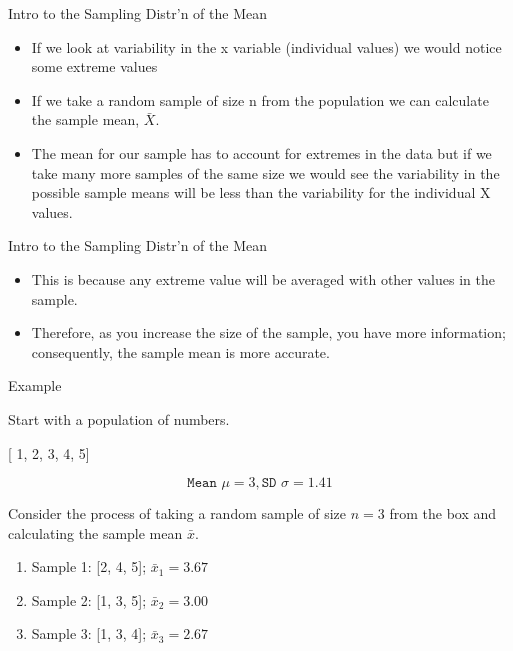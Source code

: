 \documentclass[14pt]{beamer}\usepackage[]{graphicx}\usepackage[]{color}
\begin{document}
\begin{frame}[fragile]{Intro to the Sampling Distr'n of the Mean}

\begin{itemize}
\item<1-> If we look at variability in the x variable (individual values) we would notice some extreme values
\item<2-> If we take a random sample of size n from the population we can calculate the sample mean, $\bar{X}$.
\item<3-> The mean for our sample has to account for extremes in  the data but if we take many more samples of the same size we would see the variability in the possible sample means will be less than the variability for the individual X values.
\end{itemize}
\end{frame}

\begin{frame}[fragile]{Intro to the Sampling Distr'n of the Mean}

\begin{itemize}
\item<1-> This is because any extreme value will be averaged with other values in the sample. 
\item<2-> Therefore, as you increase the size of the sample, you have  more information; consequently, the sample mean is more accurate.
\end{itemize}
\end{frame}

\begin{frame}[fragile]{Example}

Start with a population of numbers.

[ 1, 2, 3, 4, 5]

$$\texttt{Mean } \mu = 3, \texttt{SD } \sigma = 1.41$$

Consider the process of taking a random sample of size $n = 3$  from the box and calculating the sample mean $\bar{x}$. 

\begin{enumerate}
\item<1-> Sample 1: [2, 4, 5];  $\bar{x}_1 = 3.67$
\item<2-> Sample 2: [1, 3, 5];  $\bar{x}_2 = 3.00$
\item<3-> Sample 3: [1, 3, 4];  $\bar{x}_3 = 2.67$
\end{enumerate}
\end{frame}
\end{document}
